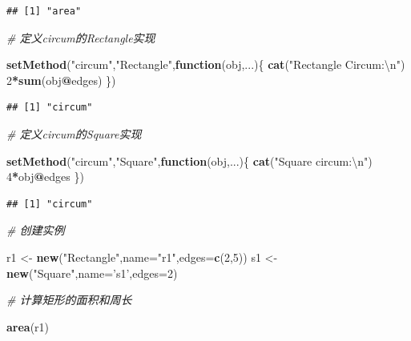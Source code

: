 \documentclass[]{book}
\newenvironment{Shaded}{\begin{snugshade}}{\end{snugshade}}
\newcommand{\KeywordTok}[1]{\textcolor[rgb]{0.13,0.29,0.53}{\textbf{#1}}}
\newcommand{\DataTypeTok}[1]{\textcolor[rgb]{0.13,0.29,0.53}{#1}}
\newcommand{\DecValTok}[1]{\textcolor[rgb]{0.00,0.00,0.81}{#1}}
\newcommand{\CharTok}[1]{\textcolor[rgb]{0.31,0.60,0.02}{#1}}
\newcommand{\StringTok}[1]{\textcolor[rgb]{0.31,0.60,0.02}{#1}}
\newcommand{\CommentTok}[1]{\textcolor[rgb]{0.56,0.35,0.01}{\textit{#1}}}
\newcommand{\ControlFlowTok}[1]{\textcolor[rgb]{0.13,0.29,0.53}{\textbf{#1}}}
\newcommand{\OperatorTok}[1]{\textcolor[rgb]{0.81,0.36,0.00}{\textbf{#1}}}
\newcommand{\NormalTok}[1]{#1}
\begin{document}
\begin{verbatim}
## [1] "area"
\end{verbatim}

\begin{Shaded}
\begin{Highlighting}[]
\CommentTok{# 定义circum的Rectangle实现}

\KeywordTok{setMethod}\NormalTok{(}\StringTok{"circum"}\NormalTok{,}\StringTok{"Rectangle"}\NormalTok{,}\ControlFlowTok{function}\NormalTok{(obj,...)\{}
  \KeywordTok{cat}\NormalTok{(}\StringTok{"Rectangle Circum:}\CharTok{\textbackslash{}n}\StringTok{"}\NormalTok{)}
  \DecValTok{2}\OperatorTok{*}\KeywordTok{sum}\NormalTok{(obj}\OperatorTok{@}\NormalTok{edges)}
\NormalTok{\})}
\end{Highlighting}
\end{Shaded}

\begin{verbatim}
## [1] "circum"
\end{verbatim}

\begin{Shaded}
\begin{Highlighting}[]
\CommentTok{# 定义circum的Square实现}

\KeywordTok{setMethod}\NormalTok{(}\StringTok{"circum"}\NormalTok{,}\StringTok{"Square"}\NormalTok{,}\ControlFlowTok{function}\NormalTok{(obj,...)\{}
  \KeywordTok{cat}\NormalTok{(}\StringTok{"Square circum:}\CharTok{\textbackslash{}n}\StringTok{"}\NormalTok{)}
  \DecValTok{4}\OperatorTok{*}\NormalTok{obj}\OperatorTok{@}\NormalTok{edges}
\NormalTok{\})}
\end{Highlighting}
\end{Shaded}

\begin{verbatim}
## [1] "circum"
\end{verbatim}

\begin{Shaded}
\begin{Highlighting}[]
\CommentTok{# 创建实例}

\NormalTok{r1 <-}\StringTok{ }\KeywordTok{new}\NormalTok{(}\StringTok{"Rectangle"}\NormalTok{,}\DataTypeTok{name=}\StringTok{"r1"}\NormalTok{,}\DataTypeTok{edges=}\KeywordTok{c}\NormalTok{(}\DecValTok{2}\NormalTok{,}\DecValTok{5}\NormalTok{))}
\NormalTok{s1 <-}\StringTok{ }\KeywordTok{new}\NormalTok{(}\StringTok{"Square"}\NormalTok{,}\DataTypeTok{name=}\StringTok{'s1'}\NormalTok{,}\DataTypeTok{edges=}\DecValTok{2}\NormalTok{)}

\CommentTok{# 计算矩形的面积和周长}

\KeywordTok{area}\NormalTok{(r1)}
\end{Highlighting}
\end{Shaded}
\end{document}

